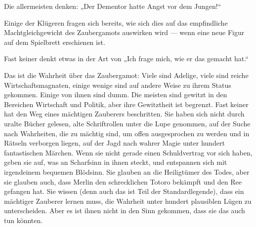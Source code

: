 Die allermeisten denken:
„Der Dementor hatte Angst vor dem Jungen!“

Einige der Klügeren fragen sich bereits, wie sich dies auf das empfindliche Machtgleichgewicht des Zaubergamots auswirken wird — wenn eine neue Figur auf dem Spielbrett erschienen ist.

Fast keiner denkt etwas in der Art von
„Ich frage mich, wie er das gemacht hat.“

Das ist die Wahrheit über das Zaubergamot: Viele sind Adelige, viele sind reiche Wirtschaftsmagnaten, einige wenige sind auf andere Weise zu ihrem Status gekommen. Einige von ihnen sind dumm. Die meisten sind gewitzt in den Bereichen Wirtschaft und Politik, aber ihre Gewitztheit ist begrenzt. Fast keiner hat den Weg eines mächtigen Zauberers beschritten. Sie haben sich nicht durch uralte Bücher gelesen, alte Schriftrollen unter die Lupe genommen, auf der Suche nach Wahrheiten, die zu mächtig sind, um offen ausgesprochen zu werden und in Rätseln verborgen liegen, auf der Jagd nach wahrer Magie unter hundert fantastischen Märchen. Wenn sie nicht gerade einen Schuldvertrag vor sich haben, geben sie auf, was an Scharfsinn in ihnen steckt, und entspannen sich mit irgendeinem bequemen Blödsinn. Sie glauben an die Heiligtümer des Todes, aber sie glauben auch, dass Merlin den schrecklichen Totoro bekämpft und den Ree gefangen hat. Sie wissen (denn auch das ist Teil der Standardlegende), dass ein mächtiger Zauberer lernen muss, die Wahrheit unter hundert plausiblen Lügen zu unterscheiden. Aber es ist ihnen nicht in den Sinn gekommen, dass sie das auch tun könnten.

